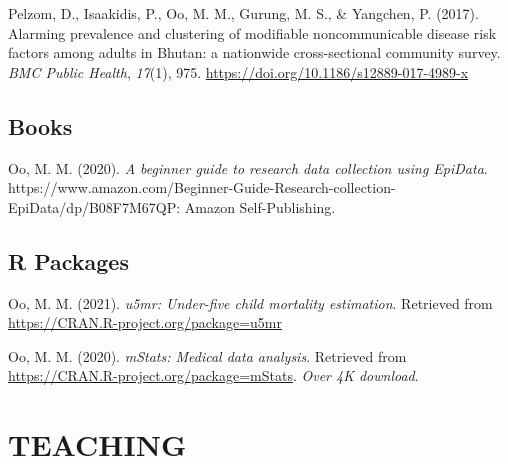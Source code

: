 \documentclass[11pt,a4paper,]{awesome-cv}
\begin{document}
\leavevmode{}%
Pelzom, D., Isaakidis, P., Oo, M. M., Gurung, M. S., \& Yangchen, P.
(2017). {Alarming prevalence and clustering of modifiable
noncommunicable disease risk factors among adults in Bhutan: a
nationwide cross-sectional community survey}. \emph{BMC Public Health},
\emph{17}(1), 975. \url{https://doi.org/10.1186/s12889-017-4989-x}

\hypertarget{books}{%
\subsection{Books}\label{books}}

\hypertarget{refs_books}{}
\leavevmode{}%
Oo, M. M. (2020). \emph{A beginner guide to research data collection
using EpiData}.
https://www.amazon.com/Beginner-Guide-Research-collection-EpiData/dp/B08F7M67QP:
Amazon Self-Publishing.

\hypertarget{r-packages}{%
\subsection{R Packages}\label{r-packages}}

\hypertarget{refs_rpackages}{}
\leavevmode{}%
Oo, M. M. (2021). \emph{u5mr: Under-five child mortality estimation}.
Retrieved from \url{https://CRAN.R-project.org/package=u5mr}

\leavevmode{}%
Oo, M. M. (2020). \emph{mStats: Medical data analysis}. Retrieved from
\url{https://CRAN.R-project.org/package=mStats}. \emph{Over 4K
download}.

\hypertarget{teaching}{%
\section{TEACHING}\label{teaching}}
\end{document}
